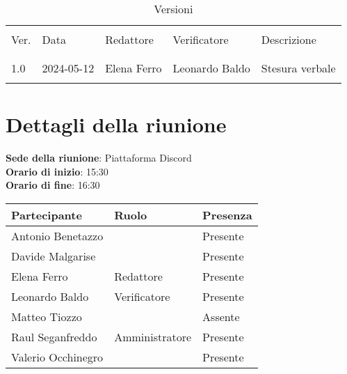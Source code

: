 \documentclass[italian,12pt]{article}
\begin{document}


\newpage



\begin{table}[!h]
	\caption{Versioni}
	\footnotesize
	\begin{center}
		\begin{tabular}{ l l l l l }
			\hline                                                             \\[-2ex]
			Ver. & Data       & Redattore   & Verificatore   & Descrizione     \\
			\\[-2ex] \hline \\[-1.5ex]
			1.0  & 2024-05-12 & Elena Ferro & Leonardo Baldo & Stesura verbale \\
			\\[-1.5ex] \hline
		\end{tabular}
	\end{center}
\end{table}

\newpage

\tableofcontents

\newpage

\section{Dettagli della riunione}


\textbf{Sede della riunione}: Piattaforma Discord\\
\textbf{Orario di inizio}: 15:30\\
\textbf{Orario di fine}: 16:30\\


\begin{flushleft}
	\begin{table}[!h]
		\begin{tabular}{ |l|l|l| }
			\hline
			\textbf{Partecipante} & \textbf{Ruolo} & \textbf{Presenza} \\
			\hline
			Antonio Benetazzo     &                & Presente          \\
			Davide Malgarise      &                & Presente          \\
			Elena Ferro           & Redattore      & Presente          \\
			Leonardo Baldo        & Verificatore   & Presente          \\
			Matteo Tiozzo         &                & Assente           \\
			Raul Seganfreddo      & Amministratore & Presente          \\
			Valerio Occhinegro    &                & Presente          \\
			\hline
		\end{tabular}
	\end{table}
\end{flushleft}
\end{document}
